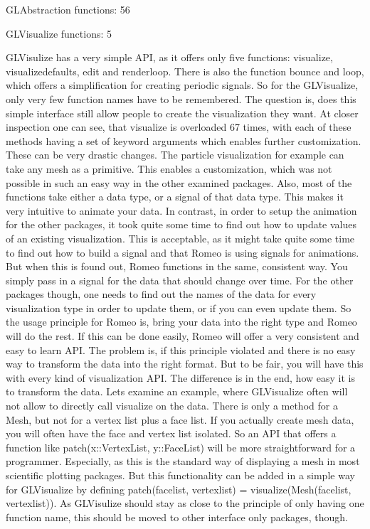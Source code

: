 GLAbstraction functions: 56

GLVisualize functions: 5

GLVisulize has a very simple API, as it offers only five functions: visualize, visualizedefaults, edit and renderloop.
There is also the function bounce and loop, which offers a simplification for creating periodic signals.
So for the GLVisualize, only very few function names have to be remembered.
The question is, does this simple interface still allow people to create the visualization they want.
At closer inspection one can see, that visualize is overloaded 67 times, with each of these methods having a set of keyword arguments which enables further customization.
These can be very drastic changes. The particle visualization for example can take any mesh as a primitive. This enables a customization, which was not possible in such an easy way in the other examined packages.
Also, most of the functions take either a data type, or a signal of that data type.
This makes it very intuitive to animate your data. 
In contrast, in order to setup the animation for the other packages, it took quite some time to find out how to update values of an existing visualization. This is acceptable, as it might take quite some time to find out how to build a signal and that Romeo is using signals for animations.
But when this is found out, Romeo functions in the same, consistent way. You simply pass in a signal for the data that should change over time.
For the other packages though, one needs to find out the names of the data for every visualization type in order to update them, or if you can even update them.
So the usage principle for Romeo is, bring your data into the right type and Romeo will do the rest.
If this can be done easily, Romeo will offer a very consistent and easy to learn API.
The problem is, if this principle violated and there is no easy way to transform the data into the right format.
But to be fair, you will have this with every kind of visualization API. The difference is in the end, how easy it is to transform the data. Lets examine an example, where GLVisualize often will not allow to directly call visualize on the data.
There is only a method for a Mesh, but not for a vertex list plus a face list. If you actually create mesh data, you will often have the face and vertex list isolated. 
So an API that offers a function like patch(x::VertexList, y::FaceList) will be more straightforward for a programmer. Especially, as this is the standard way of displaying a mesh in most scientific plotting packages.
But this functionality can be added in a simple way for GLVisualize by defining patch(facelist, vertexlist) = visualize(Mesh(facelist, vertexlist)).
As GLVisulize should stay as close to the principle of only having one function name, this should be moved to other interface only packages, though. 